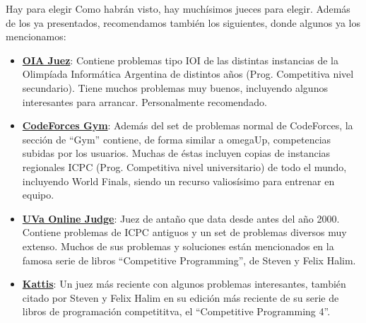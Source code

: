 \documentclass{beamer}
\begin{document}
    \begin{frame}{Hay para elegir}
        Como habrán visto, hay muchísimos jueces para elegir. Además de los ya presentados, recomendamos también los siguientes, donde algunos ya los mencionamos: \pause

        \begin{itemize}
            \item \textbf{\textcolor{blue}{\href{https://juez.oia.unsam.edu.ar/}{OIA Juez}}}: Contiene problemas tipo IOI de las distintas instancias de la Olimpíada Informática Argentina de distintos años (Prog. Competitiva nivel secundario). Tiene muchos problemas muy buenos, incluyendo algunos interesantes para arrancar. Personalmente recomendado. \pause

            \item \textbf{\textcolor{blue}{\href{https://codeforces.com/gyms}{CodeForces Gym}}}: Además del set de problemas normal de CodeForces, la sección de ``Gym'' contiene, de forma similar a omegaUp, competencias subidas por los usuarios. Muchas de éstas incluyen copias de instancias regionales ICPC (Prog. Competitiva nivel universitario) de todo el mundo, incluyendo World Finals, siendo un recurso valiosísimo para entrenar en equipo.
        \end{itemize}
    \end{frame}

    \begin{frame}[noframenumbering]
        \begin{itemize}
            \item \textbf{\textcolor{blue}{\href{https://onlinejudge.org/}{UVa Online Judge}}}: Juez de antaño que data desde antes del año 2000. Contiene problemas de ICPC antiguos y un set de problemas diversos muy extenso. Muchos de sus problemas y soluciones están mencionados en la famosa serie de libros ``Competitive Programming'', de Steven y Felix Halim. \pause

            \item \textbf{\textcolor{blue}{\href{https://open.kattis.com/}{Kattis}}}: Un juez más reciente con algunos problemas interesantes, también citado por Steven y Felix Halim en su edición más reciente de su serie de libros de programación competititva, el ``Competitive Programming 4''.
        \end{itemize}
    \end{frame}
\end{document}
